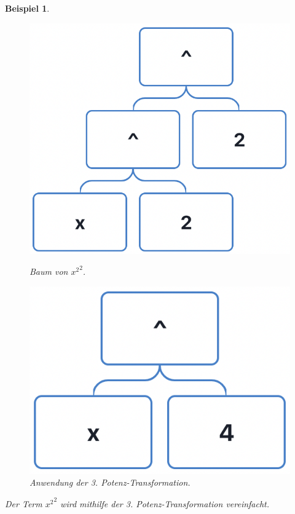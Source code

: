 \documentclass[11pt]{article}
\newtheorem{example}{Beispiel}
\begin{document}
\begin{example}
  \begin{figure}[h!]
    \begin{minipage}{.5\textwidth}
      \centering
      \includegraphics[scale=0.4]{trees/power/beispiel_2_1.png}
      \caption{Baum von ${x^2}^2$.}
    \end{minipage}
    \begin{minipage}{.5\textwidth}
      \centering
      \includegraphics[scale=0.4]{trees/power/beispiel_2_2.png}
      \caption{Anwendung der 3. Potenz-Transformation.}
    \end{minipage}
  \end{figure}
  Der Term ${x^2}^2$ wird mithilfe der 3. Potenz-Transformation vereinfacht. 
\end{example}
\end{document}
